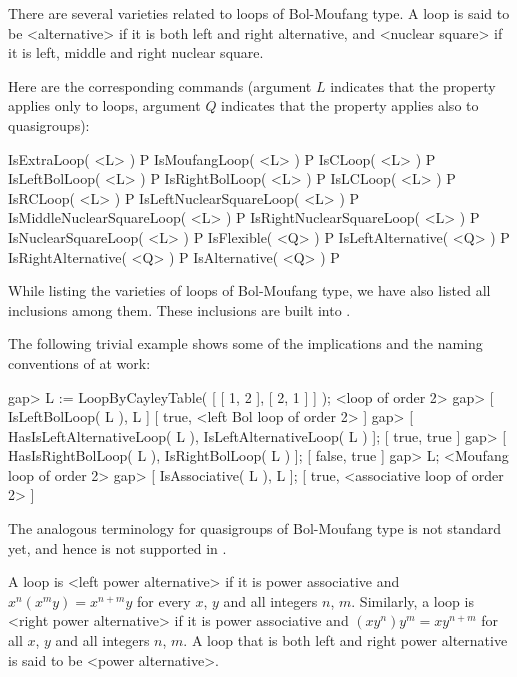 There are several varieties related to loops of Bol-Moufang type. A loop is
said to be <alternative> if it
is both left and right alternative, and <nuclear square> if it is left, middle and right nuclear
square.

Here are the corresponding {\LOOPS} commands (argument $L$ indicates that the
property applies only to loops, argument $Q$ indicates that the property
applies also to quasigroups):

\>IsExtraLoop( <L> ) P
\>IsMoufangLoop( <L> ) P
\>IsCLoop( <L> ) P
\>IsLeftBolLoop( <L> ) P
\>IsRightBolLoop( <L> ) P
\>IsLCLoop( <L> ) P
\>IsRCLoop( <L> ) P
\>IsLeftNuclearSquareLoop( <L> ) P
\>IsMiddleNuclearSquareLoop( <L> ) P
\>IsRightNuclearSquareLoop( <L> ) P
\>IsNuclearSquareLoop( <L> ) P
\>IsFlexible( <Q> ) P
\>IsLeftAlternative( <Q> ) P
\>IsRightAlternative( <Q> ) P
\>IsAlternative( <Q> ) P

While listing the varieties of loops of Bol-Moufang type, we have also listed
all inclusions among them. These inclusions are built into {\LOOPS}.

The following trivial example shows some of the implications and the naming
conventions of {\LOOPS} at work:

\beginexample
gap> L := LoopByCayleyTable( [ [ 1, 2 ], [ 2, 1 ] ] );
<loop of order 2>
gap> [ IsLeftBolLoop( L ), L ]
[ true, <left Bol loop of order 2> ]
gap> [ HasIsLeftAlternativeLoop( L ), IsLeftAlternativeLoop( L ) ];
[ true, true ]
gap> [ HasIsRightBolLoop( L ), IsRightBolLoop( L ) ];
[ false, true ]
gap> L;
<Moufang loop of order 2>
gap> [ IsAssociative( L ), L ];
[ true, <associative loop of order 2> ]
\endexample

The analogous terminology for quasigroups of Bol-Moufang type is not
standard yet, and hence is not supported in {\LOOPS}.


A loop is <left power alternative> if it is
power associative and $x^n(x^m y) = x^{n+m}y$ for every $x$, $y$ and all
integers $n$, $m$. Similarly, a loop is <right power alternative> if it is power associative and $(xy^n)y^m = xy^{n+m}$
for all $x$, $y$ and all integers $n$, $m$. A loop that is both left and right
power alternative is said to be <power alternative>.

